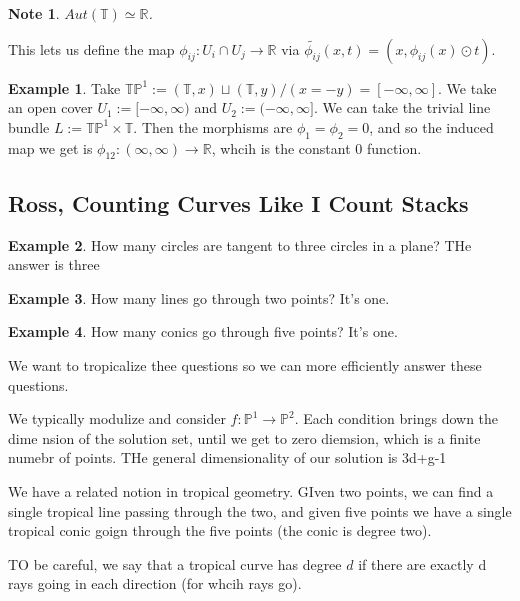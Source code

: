 \documentclass[11pt]{article}
\newtheorem{note}{Note}
\theoremstyle{definition}
\newtheorem{protoexample}{Example}[section]
\newenvironment{ex}
   {\begin{protoexample}}
   {\end{protoexample}}
\def\RR{{\mathbb R}}
\def\TT{{\mathbb T}}
\def\PP{{\mathbb P}}
\begin{document}
  \begin{note}
    $Aut(\TT) \simeq \RR$.
  \end{note}



  This lets us define the map $\phi_{ij} : U _i \cap U_j \rightarrow \RR$ via
  $\tilde{\phi_{ij}}(x,t) = (x,\phi_{ij}(x) \odot t)$.


  \begin{ex}
    Take $\TT\PP^1 := (\TT,x) \sqcup (\TT,y)/(x=-y)=[-\infty,\infty]$. We take an open cover $U_1:= [-\infty, \infty)$ and $U_2:=(-\infty, \infty]$. We can take the trivial line bundle $L:=\TT\PP^1 \times \TT$. Then the morphisms are $\phi_1=\phi_2=0$, and so the induced map we get is $\phi_{12}:(\infty,\infty) \rightarrow \RR$, whcih is the constant $0$ function.
  \end{ex}



  \subsection{Ross, Counting Curves Like I Count Stacks}

\begin{ex}
    How many circles are tangent to three circles in a plane? THe answer is three
\end{ex}

\begin{ex}
    How many lines go through two points? It's one.
\end{ex}

\begin{ex}
    How many conics go through five points? It's one.
\end{ex}

We want to tropicalize thee questions so we can more efficiently answer these questions.

We typically modulize and consider $f:\PP^1 \rightarrow \PP^2$. Each condition brings down the dime nsion of the solution set, until we get to zero diemsion, which is a finite numebr of points. THe general dimensionality of our solution is 3d+g-1

We have a related notion in tropical geometry. GIven two points, we can find a single tropical line passing through the two, and given five points we have a single tropical conic goign through the five points (the conic is degree two). 


TO be careful, we say that a tropical curve has degree $d$ if there are exactly d rays going in each direction (for whcih rays go).
\end{document}
